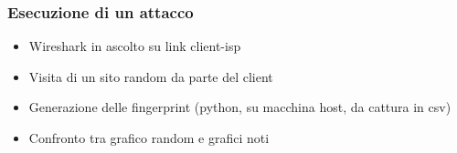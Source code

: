 \documentclass{beamer}[10pt]
\begin{document}
\begin{frame}
  \frametitle{Esecuzione di un attacco}
  \begin{itemize}
    \item Wireshark in ascolto su link client-isp
    \item Visita di un sito random da parte del client
    \item Generazione delle fingerprint (python, su macchina host, da cattura in csv)
    \item Confronto tra grafico random e grafici noti
  \end{itemize}
\end{frame}



\end{document}
